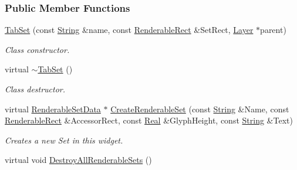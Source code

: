 \subsubsection*{Public Member Functions}
\begin{DoxyCompactItemize}
\item 
\hyperlink{classMezzanine_1_1UI_1_1TabSet_a4ae5a3399c55d8c0d1933e8ddd30f582}{TabSet} (const \hyperlink{namespaceMezzanine_acf9fcc130e6ebf08e3d8491aebcf1c86}{String} \&name, const \hyperlink{structMezzanine_1_1UI_1_1RenderableRect}{RenderableRect} \&SetRect, \hyperlink{classMezzanine_1_1UI_1_1Layer}{Layer} $\ast$parent)
\begin{DoxyCompactList}\small\item\em Class constructor. \item\end{DoxyCompactList}\item 
\hypertarget{classMezzanine_1_1UI_1_1TabSet_aefeb37272d3019a728fcf93232831ab9}{
virtual \hyperlink{classMezzanine_1_1UI_1_1TabSet_aefeb37272d3019a728fcf93232831ab9}{$\sim$TabSet} ()}
\label{classMezzanine_1_1UI_1_1TabSet_aefeb37272d3019a728fcf93232831ab9}

\begin{DoxyCompactList}\small\item\em Class destructor. \item\end{DoxyCompactList}\item 
virtual \hyperlink{structMezzanine_1_1UI_1_1RenderableSetData}{RenderableSetData} $\ast$ \hyperlink{classMezzanine_1_1UI_1_1TabSet_a8b3fd7e997f0a4cd7c68d915077621a7}{CreateRenderableSet} (const \hyperlink{namespaceMezzanine_acf9fcc130e6ebf08e3d8491aebcf1c86}{String} \&Name, const \hyperlink{structMezzanine_1_1UI_1_1RenderableRect}{RenderableRect} \&AccessorRect, const \hyperlink{namespaceMezzanine_a726731b1a7df72bf3583e4a97282c6f6}{Real} \&GlyphHeight, const \hyperlink{namespaceMezzanine_acf9fcc130e6ebf08e3d8491aebcf1c86}{String} \&Text)
\begin{DoxyCompactList}\small\item\em Creates a new Set in this widget. \item\end{DoxyCompactList}\item 
\hypertarget{classMezzanine_1_1UI_1_1TabSet_a37399125aa416568a72376d0ffd799ed}{
virtual void \hyperlink{classMezzanine_1_1UI_1_1TabSet_a37399125aa416568a72376d0ffd799ed}{DestroyAllRenderableSets} ()}
\label{classMezzanine_1_1UI_1_1TabSet_a37399125aa416568a72376d0ffd799ed}


\end{DoxyCompactItemize}
